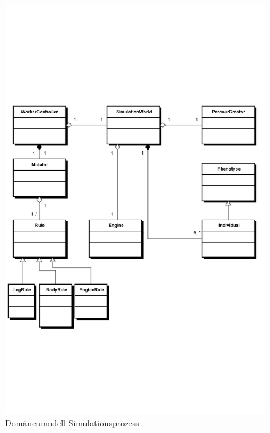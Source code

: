       \begin{figure}
        \includegraphics[width=\textwidth,center]{graphics/uml/domain-model-simulation}
        \caption{Domänenmodell Simulationsprozess\label{fig:simulationProcess}}
      \end{figure}
